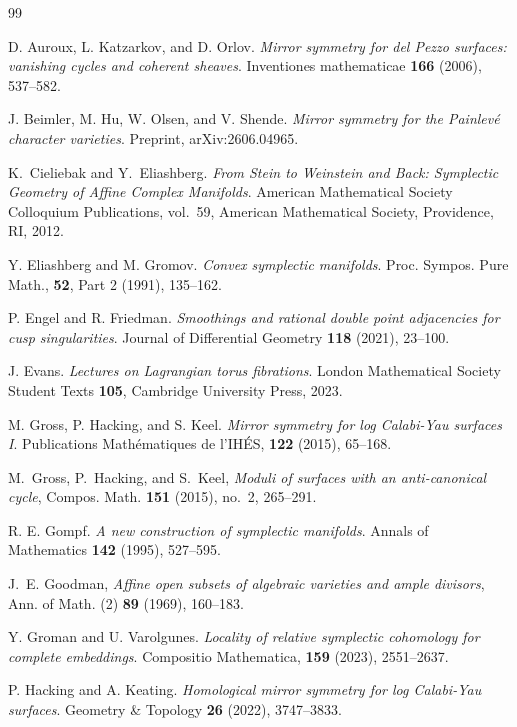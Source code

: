 \documentclass[11pt, reqno]{amsart}
\theoremstyle{definition}
\begin{document}
\begin{thebibliography}{99}


D. Auroux, L. Katzarkov, and D. Orlov.
\textit{Mirror symmetry for del Pezzo surfaces: vanishing cycles and coherent sheaves}.
Inventiones mathematicae \textbf{166} (2006), 537--582.

J. Beimler, M. Hu, W. Olsen, and V. Shende.
\textit{Mirror symmetry for the Painlevé character varieties}.
Preprint, arXiv:2606.04965.

K.~Cieliebak and Y.~Eliashberg.
\newblock \emph{From Stein to Weinstein and Back: Symplectic Geometry of Affine Complex Manifolds}.
\newblock American Mathematical Society Colloquium Publications, vol.~59, American Mathematical Society, Providence, RI, 2012.


Y. Eliashberg and M. Gromov. 
\textit{Convex symplectic manifolds}. 
Proc. Sympos. Pure Math., \textbf{52}, Part 2 (1991), 135--162.

P. Engel and R. Friedman.
\textit{Smoothings and rational double point adjacencies for cusp singularities}.
Journal of Differential Geometry \textbf{118} (2021), 23--100.

J. Evans.
\textit{Lectures on Lagrangian torus fibrations}.
London Mathematical Society Student Texts \textbf{105}, Cambridge University Press, 2023.


M. Gross, P. Hacking, and S. Keel. 
\textit{Mirror symmetry for log Calabi-Yau surfaces I}. 
Publications Mathématiques de l'IHÉS, \textbf{122} (2015), 65--168.


M.~Gross, P.~Hacking, and S.~Keel,
\emph{Moduli of surfaces with an anti-canonical cycle},
Compos. Math. \textbf{151} (2015), no.~2, 265--291.


R. E. Gompf.
\textit{A new construction of symplectic manifolds}.
Annals of Mathematics \textbf{142} (1995), 527--595.

 J.~E. Goodman, \emph{Affine open subsets of algebraic varieties and ample divisors}, Ann. of Math. (2) \textbf{89} (1969), 160--183.

Y. Groman and U. Varolgunes. 
\textit{Locality of relative symplectic cohomology for complete embeddings}. 
Compositio Mathematica, \textbf{159} (2023), 2551--2637.

P. Hacking and A. Keating. 
\textit{Homological mirror symmetry for log Calabi-Yau surfaces}. 
Geometry \& Topology \textbf{26} (2022), 3747--3833.


\end{thebibliography}
\end{document}

